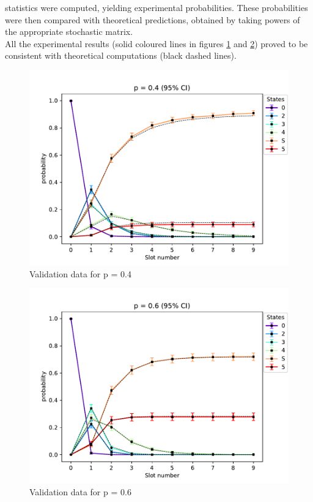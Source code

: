 statistics were computed, yielding experimental probabilities. These
probabilities were then compared with theoretical predictions, obtained by
taking powers of the appropriate stochastic matrix.\\
All the experimental results (solid coloured lines in figures
\ref{fig:5to1validPlot1} and \ref{fig:5to1validPlot2}) proved to be consistent
with theoretical computations (black dashed lines).
\begin{figure}[H]
    \begin{center}
        \includegraphics[scale=0.7]{img/star5to1p=0.4validation.pdf}
        \caption{Validation data for p = 0.4}
        \label{fig:5to1validPlot1}
    \end{center}
    \vspace*{-0.8cm}
\end{figure}
\begin{figure}[H]
    \begin{center}
        \includegraphics[scale=0.7]{img/star5to1p=0.6validation.pdf}
        \caption{Validation data for p = 0.6}
        \label{fig:5to1validPlot2}
    \end{center}
    \vspace*{-0.8cm}
\end{figure}
